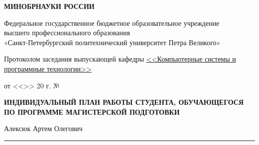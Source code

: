 \begin{center}

\textbf{МИНОБРНАУКИ РОССИИ}

\vspace{1em}
Федеральное государственное бюджетное образовательное учреждение\\
высшего профессионального образования\\
«Санкт-Петербургский политехнический университет Петра Великого»

\end{center}

\vspace{1em}

\begin{multicols}{2}

    \phantom{foo}

    \columnbreak


    \begin{flushleft}
        Протоколом заседания выпускающей кафедры
        \uline{<<Компьютерные системы и программные технологии>> \hfill}

        \vspace{1em}

        от <<\uline{\hphantom{200}}>> \uline{\hphantom{декабрььььь}}
        20\uline{\hphantom{130}} г. № \uline{\hphantom{1300}}
    \end{flushleft}
\end{multicols}

\vspace{15pt}

\begin{center}
    \textbf{ИНДИВИДУАЛЬНЫЙ ПЛАН РАБОТЫ СТУДЕНТА, ОБУЧАЮЩЕГОСЯ ПО ПРОГРАММЕ
    МАГИСТЕРСКОЙ ПОДГОТОВКИ}

    \vspace{1em}

    Алексюк Артем Олегович\hrule
\end{center}

